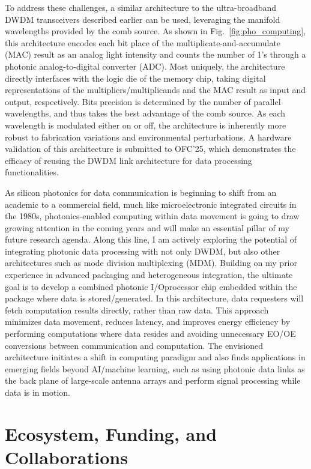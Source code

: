To address these challenges, a similar architecture to the ultra-broadband DWDM transceivers described earlier can be used, leveraging the manifold wavelengths provided by the comb source. As shown in Fig.~\ref{fig:pho_computing}, this architecture encodes each bit place of the multiplicate-and-accumulate (MAC) result as an analog light intensity and counts the number of 1's through a photonic analog-to-digital converter (ADC). Most uniquely, the architecture directly interfaces with the logic die of the memory chip, taking digital representations of the multipliers/multiplicands and the MAC result as input and output, respectively. Bits precision is determined by the number of parallel wavelengths, and thus takes the best advantage of the comb source. As each wavelength is modulated either on or off, the architecture is inherently more robust to fabrication variations and environmental perturbations. A hardware validation of this architecture is submitted to OFC'25, which demonstrates the efficacy of reusing the DWDM link architecture for data processing functionalities.

As silicon photonics for data communication is beginning to shift from an academic to a commercial field, much like microelectronic integrated circuits in the 1980s, photonics-enabled computing within data movement is going to draw growing attention in the coming years and will make an essential pillar of my future research agenda. Along this line, I am actively exploring the potential of integrating photonic data processing with not only DWDM, but also other architectures such as mode division multiplexing (MDM). Building on my prior experience in advanced packaging and heterogeneous integration, the ultimate goal is to develop a combined photonic I/O\textendash{}processor chip embedded within the package where data is stored/generated. In this architecture, data requesters will fetch computation results directly, rather than raw data. This approach minimizes data movement, reduces latency, and improves energy efficiency by performing computations where data resides and avoiding unnecessary EO/OE conversions between communication and computation. The envisioned architecture initiates a shift in computing paradigm and also finds applications in emerging fields beyond AI/machine learning, such as using photonic data links as the back plane of large-scale antenna arrays and perform signal processing while data is in motion.

\section*{Ecosystem, Funding, and Collaborations}


